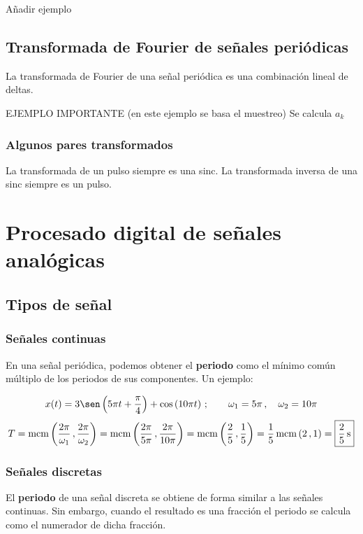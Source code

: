 \documentclass[a4paper]{book}
\begin{document}
Añadir ejemplo

\section{Transformada de Fourier de señales periódicas}

La transformada de Fourier de una señal periódica es una combinación lineal de deltas.

EJEMPLO IMPORTANTE (en este ejemplo se basa el muestreo)
Se calcula $a_k$
\subsection{Algunos pares transformados}

La transformada de un pulso siempre es una sinc.
La transformada inversa de una sinc siempre es un pulso.

\chapter{Procesado digital de señales analógicas}

\section{Tipos de señal} \vspace{\parskip}

\subsection{Señales continuas}

En una señal periódica, podemos obtener el \textbf{periodo} como el mínimo común múltiplo de los periodos de sus componentes. Un ejemplo:

\[ x(t) = 3 \sen \left( 5\pi t + \frac{\pi}{4} \right) + \cos \left( 10\pi t \right)\, ;\qquad \omega_1 = 5\pi \, , \quad \omega_2 = 10\pi \]
\[ T = \mcm \left( \frac{2\pi}{\omega_1} \, , \frac{2\pi}{\omega_2} \right) = \mcm \left( \frac{2\pi}{5\pi} \, , \frac{2\pi}{10\pi} \right) = \mcm \left( \frac{2}{5} \, , \frac{1}{5} \right) = \frac{1}{5} \mcm \left( 2 \, , 1 \right) = \boxed{\frac{2}{5} \, \unit{\s}}\]

\subsection{Señales discretas}

El \textbf{periodo} de una señal discreta se obtiene de forma similar a las señales continuas. Sin embargo, cuando el resultado es una fracción el periodo se calcula como el numerador de dicha fracción.
\end{document}

